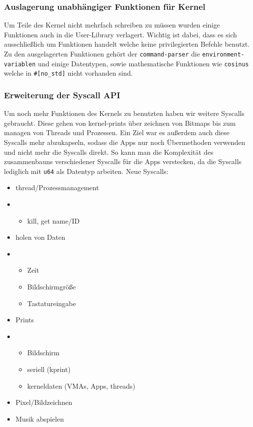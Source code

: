     \subsubsection{Auslagerung unabhängiger Funktionen für Kernel}
        Um Teile des Kernel nicht mehrfach schreiben zu müssen wurden einige Funktionen auch in die User-Library verlagert. Wichtig ist dabei, dass es sich ausschließlich um Funktionen handelt welche keine privilegierten Befehle benutzt. Zu den ausgelagerten Funktionen gehört der \verb|command-parser| die \verb|environment-variablen| und einige Datentypen, sowie mathematische Funktionen wie \verb|cosinus| welche in \verb|#[no_std]| nicht vorhanden sind.


    \subsubsection{Erweiterung der Syscall API}
        Um noch mehr Funktionen des Kernels zu benutzten haben wir weitere Syscalls gebraucht. Diese gehen von kernel-prints über zeichnen von Bitmaps bis zum managen von Threads und Prozessen. \newline
        Ein Ziel war es außerdem auch diese Syscalls mehr abzukapseln, sodass die Apps nur noch Übermethoden verwenden und nicht mehr die Syscalls direkt. So kann man die Komplexität des zusammenbauns verschiedener Syscalls für die Apps verstecken, da die Syscalls lediglich mit \verb|u64| als Datentyp arbeiten. \newline
        Neue Syscalls:
        \begin{itemize}
            \item thread/Prozessmanagement
            \item [] \begin{itemize}
                \item kill, get name/ID
            \end{itemize}
            \item holen von Daten
            \item [] \begin{itemize}
                \item Zeit
                \item Bildschirmgröße
                \item Tastatureingabe
            \end{itemize}
            \item Prints
            \item [] \begin{itemize}
                \item Bildschirm
                \item seriell (kprint)
                \item kerneldaten (VMAs, Apps, threads)
            \end{itemize}
            \item Pixel/Bildzeichnen
            \item Musik abspielen
        \end{itemize}
